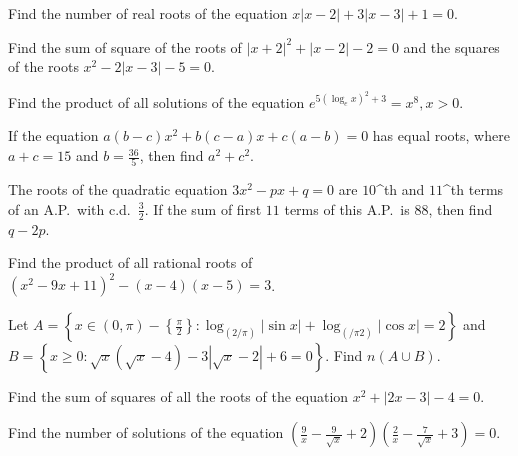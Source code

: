 \item Find the number of real roots of the equation $x|x - 2| + 3|x - 3| + 1 = 0$.
\item Find the sum of square of the roots of $|x + 2|^2 + |x - 2| - 2 = 0$ and the squares of the roots $x^2
  - 2|x - 3| - 5 = 0$.
\item Find the product of all solutions of the equation $e^{5\left(\log_ex\right)^2 + 3} = x^8, x > 0$.
\item If the equation $a(b - c)x^2 + b(c - a)x + c(a - b) = 0$ has equal roots, where $a + c = 15$ and $b
  = \frac{36}{5}$, then find $a^2 + c^2$.
\item The roots of the quadratic equation $3x^2 - px + q = 0$ are $10$^{th} and $11$^{th} terms of an A.P.\
  with c.d.\ $\frac{3}{2}$. If the sum of first $11$ terms of this A.P.\ is $88$, then find $q - 2p$.
\item Find the product of all rational roots of $\left(x^2 - 9x + 11\right)^2 - (x - 4)(x - 5) = 3$.
\item Let $A = \left\{x\in(0, \pi) - \left\{\frac{\pi}{2}\right\}: \log_{(2/\pi)}|\sin x|
  + \log_{(/\pi2)}|\cos x| = 2\right\}$ and $B = \left\{x\geq 0: \sqrt{x}\left(\sqrt{x} - 4\right) -
  3\left|\sqrt{x} - 2\right| + 6 = 0\right\}$. Find $n(A\cup B)$.
\item Find the sum of squares of all the roots of the equation $x^2 + |2x - 3| - 4 = 0$.
\item Find the number of solutions of the equation $\left(\frac{9}{x} - \frac{9}{\sqrt{x}} +
  2\right)\left(\frac{2}{x} - \frac{7}{\sqrt{x}} + 3\right) = 0$.
\stopitemize
